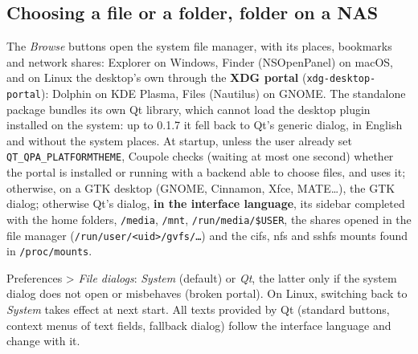 \subsection{Choosing a file or a folder, folder on a NAS}\label{sec:dialogues}
The \emph{Browse} buttons open the system file manager, with its places, bookmarks and network shares: Explorer on
Windows, Finder (NSOpenPanel) on macOS, and on Linux the desktop's own through the \textbf{XDG portal}
(\texttt{xdg-desktop-portal}): Dolphin on KDE Plasma, Files (Nautilus) on GNOME. The standalone package bundles its own
Qt library, which cannot load the desktop plugin installed on the system: up to 0.1.7 it fell back to Qt's generic
dialog, in English and without the system places. At startup, unless the user already set
\texttt{QT\_QPA\_PLATFORMTHEME}, Coupole checks (waiting at most one second) whether the portal is installed or
running with a backend able to choose files, and uses it; otherwise, on a GTK desktop (GNOME, Cinnamon, Xfce,
MATE…), the GTK dialog; otherwise Qt's dialog, \textbf{in the interface language}, its sidebar completed with the home
folders, \texttt{/media}, \texttt{/mnt}, \texttt{/run/media/\$USER}, the shares opened in the file manager
(\texttt{/run/user/<uid>/gvfs/…}) and the cifs, nfs and sshfs mounts found in \texttt{/proc/mounts}.

Preferences > \emph{File dialogs}: \emph{System} (default) or \emph{Qt}, the latter only if the system dialog does not
open or misbehaves (broken portal). On Linux, switching back to \emph{System} takes effect at next start. All texts
provided by Qt (standard buttons, context menus of text fields, fallback dialog) follow the interface language and
change with it.

